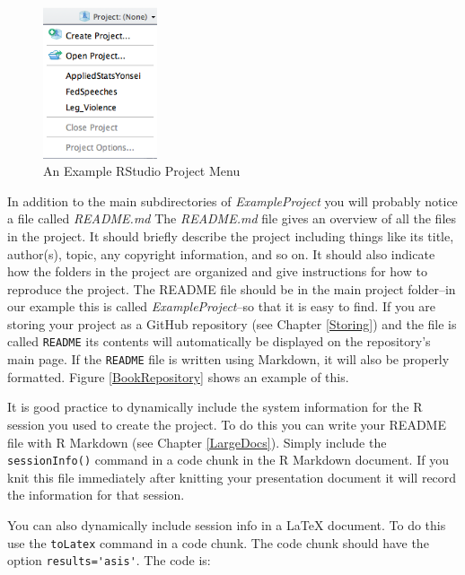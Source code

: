 \documentclass[krantz1]{krantz}
\begin{document}
\begin{figure}
    \caption{An Example RStudio Project Menu}
    \label{ProjectMenu}
    \begin{center}
    \includegraphics[width=0.3\textwidth]{Children/Chapter4/images4/ProjectMenu.png}
    \end{center}
\end{figure}


In addition to the main subdirectories of {\emph{ExampleProject}} you will probably notice a file called {\emph{README.md}} The {\emph{README.md}} file gives an overview of all the files in the project. It should briefly describe the project including things like its title, author(s), topic, any copyright information, and so on. It should also indicate how the folders in the project are organized and give instructions for how to reproduce the project. The README file should be in the main project folder--in our example this is called {\emph{ExampleProject}}--so that it is easy to find. If you are storing your project as a GitHub repository (see Chapter \ref{Storing}) and the file is called \texttt{README} its contents will automatically be displayed on the repository's main page. If the \texttt{README} file is written using Markdown, it will also be properly formatted. Figure \ref{BookRepository} shows an example of this.

It is good practice to dynamically include the system information for the R session you used to create the project. To do this you can write your README file with R Markdown (see Chapter \ref{LargeDocs}). Simply include the \texttt{sessionInfo()} command in a code chunk in the R Markdown document. If you knit this file immediately after knitting your presentation document it will record the information for that session.

You can also dynamically include session info in a LaTeX document. To do this use the {\tt{toLatex}} command in a code chunk. The code chunk should have the option \verb|results='asis'|. The code is:
\end{document}
